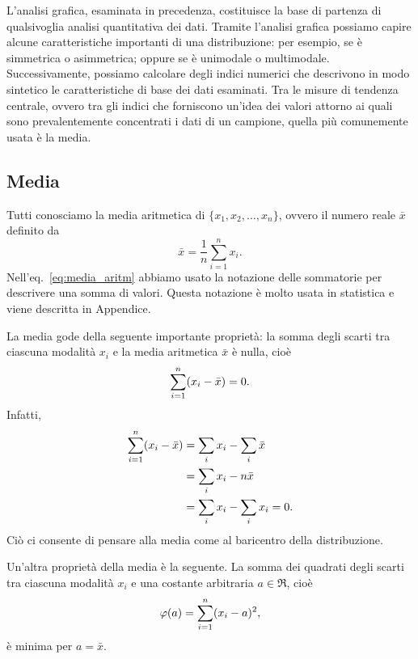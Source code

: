 L'analisi   grafica,  esaminata in precedenza, costituisce la base di partenza di qualsivoglia analisi quantitativa dei dati.
Tramite l'analisi grafica possiamo capire alcune caratteristiche importanti di una distribuzione: per esempio, se è simmetrica o asimmetrica; oppure se è unimodale o multimodale.
Successivamente, possiamo calcolare degli indici numerici che descrivono in modo sintetico le  caratteristiche  di  base  dei  dati esaminati.
Tra le misure di tendenza centrale, ovvero tra gli indici che forniscono un'idea dei valori attorno ai quali sono prevalentemente concentrati i dati di un campione, quella più comunemente usata è la media. 


\subsection{Media}

Tutti conosciamo la media aritmetica di $\{x_1, x_2, \dots, x_n\}$, ovvero il numero reale $\bar{x}$ definito da
 \begin{equation}
 \bar{x}=\frac{1}{n}\sum_{i=1}^n x_i.
 \label{eq:media_aritm}
 \end{equation}
Nell'eq.~\eqref{eq:media_aritm} abbiamo usato la notazione delle sommatorie per descrivere una somma di valori.
Questa notazione è molto usata in statistica e viene descritta in Appendice.

La media gode della seguente importante proprietà: la somma degli scarti tra ciascuna modalità $x_i$ e la media aritmetica $\bar{x}$ è nulla, cioè
\begin{equation}
\sum_{i=1}^n (x_i - \bar{x}) = 0.\notag
\label{eq:diffmeansumzero}
\end{equation}
Infatti,
 \begin{align}
\sum_{i=1}^n (x_i - \bar{x}) &= \sum_i x_i - \sum_i \bar{x}\notag\\
&= \sum_i x_i - n \bar{x}\notag\\
&= \sum_i x_i - \sum_i x_i = 0.\notag
\end{align}
Ciò ci consente di pensare alla media come al baricentro della distribuzione.

Un'altra proprietà della media è la seguente.
La somma dei quadrati degli scarti tra ciascuna modalità $x_i$ e una costante arbitraria $a \in \Re$, cioè
\begin{equation}
\varphi(a) = \sum_{i=1}^n (x_i - a)^2,\notag
\end{equation}
è minima per $a = \bar{x}$.

